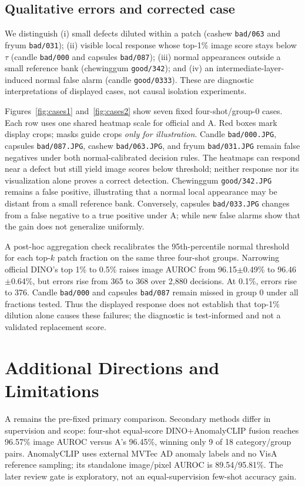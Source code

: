 \documentclass[times,10pt,twocolumn,letterpaper]{article}
\begin{document}
\subsection{Qualitative errors and corrected case}
We distinguish (i) small defects diluted within a patch (cashew \texttt{bad/063} and fryum \texttt{bad/031}); (ii) visible local response whose top-1\% image score stays below $\tau$ (candle \texttt{bad/000} and capsules \texttt{bad/087}); (iii) normal appearances outside a small reference bank (chewinggum \texttt{good/342}); and (iv) an intermediate-layer-induced normal false alarm (candle \texttt{good/0333}). These are diagnostic interpretations of displayed cases, not causal isolation experiments.

Figures~\ref{fig:cases1} and~\ref{fig:cases2} show seven fixed four-shot/group-0 cases. Each row uses one shared heatmap scale for official and A. Red boxes mark display crops; masks guide crops \emph{only for illustration}. Candle \texttt{bad/000.JPG}, capsules \texttt{bad/087.JPG}, cashew \texttt{bad/063.JPG}, and fryum \texttt{bad/031.JPG} remain false negatives under both normal-calibrated decision rules. The heatmaps can respond near a defect but still yield image scores below threshold; neither response nor its visualization alone proves a correct detection. Chewinggum \texttt{good/342.JPG} remains a false positive, illustrating that a normal local appearance may be distant from a small reference bank. Conversely, capsules \texttt{bad/033.JPG} changes from a false negative to a true positive under A; while new false alarms show that the gain does not generalize uniformly.

A post-hoc aggregation check recalibrates the 95th-percentile normal threshold for each top-$k$ patch fraction on the same three four-shot groups. Narrowing official DINO's top 1\% to 0.5\% raises image AUROC from 96.15$\pm$0.49\% to 96.46$\pm$0.64\%, but errors rise from 365 to 368 over 2,880 decisions. At 0.1\%, errors rise to 376. Candle \texttt{bad/000} and capsules \texttt{bad/087} remain missed in group 0 under all fractions tested. Thus the displayed response does not establish that top-1\% dilution alone causes these failures; the diagnostic is test-informed and not a validated replacement score.



\FloatBarrier
\section{Additional Directions and Limitations}
\label{sec:additional}
A remains the pre-fixed primary comparison. Secondary methods differ in supervision and scope: four-shot equal-score DINO+AnomalyCLIP fusion reaches 96.57\% image AUROC versus A's 96.45\%, winning only 9 of 18 category/group pairs. AnomalyCLIP uses external MVTec AD anomaly labels and no VisA reference sampling; its standalone image/pixel AUROC is 89.54/95.81\%. The later review gate is exploratory, not an equal-supervision few-shot accuracy gain.
\end{document}
